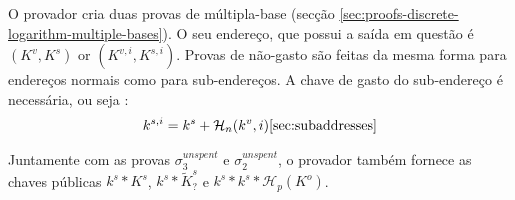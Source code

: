 

O provador cria duas provas de múltipla-base (secção \ref{sec:proofs-discrete-logarithm-multiple-bases}). O seu endereço, que possui a saída em questão é $(K^v, K^s)$ or $(K^{v,i}, K^{s,i})$. Provas de não-gasto são feitas da mesma forma para endereços normais como para sub-endereços. A chave de gasto do sub-endereço é necessária, ou seja : 
\begin{align*}
k^{s,i} = k^s + \mathcal{H}_n(k^v,i) \ref{sec:subaddresses}
\end{align*}

\iffalse
\begin{enumerate}
    \item Uma prova com 3 bases, em que a chave signatária é $k^s$, e\vspace{.175cm}  
    \begin{align*}
        \mathcal{J}^{\textrm{nãogasto}}_3 &= \{[G], [K^s], [\tilde{K}^s_?]\}\\
        \mathcal{K}^{\textrm{nãogasto}}_3 &= \{[K^s], [k^s*K^s], [k^s*\tilde{K}^s_?]\}
    \end{align*}{}
    \item Uma prova com 2 bases, em que a chave signatária é $k^s*k^s$, e\vspace{.175cm}
    \begin{align*}
        \mathcal{J}^{\textrm{nãogasto}}_2 &= \{[G], [\mathcal{H}_p(K^o)]\}\\
        \mathcal{K}^{\textrm{nãogasto}}_2 &= \{[k^s*K^s], [k^s*k^s*\mathcal{H}_p(K^o)]\}
    \end{align*}{}
\end{enumerate}{}
\fi
Juntamente com as provas $\sigma^{unspent}_3$ e $\sigma^{unspent}_2$, o provador também fornece as chaves públicas $k^s*K^s$, $k^s*\tilde{K}^s_?$ e $k^s*k^s*\mathcal{H}_p(K^o)$.

